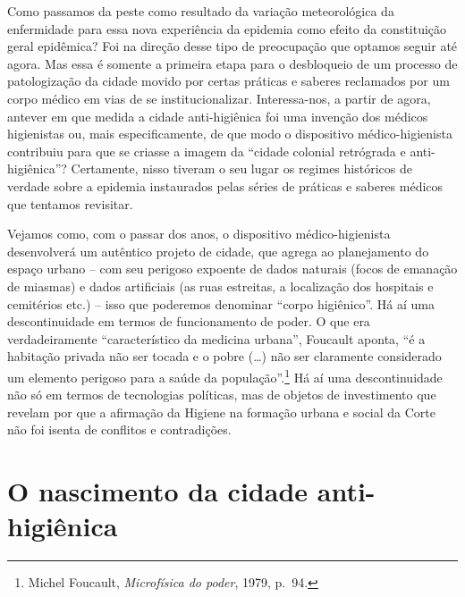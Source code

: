 Como passamos da peste como resultado da variação meteorológica da
enfermidade para essa nova experiência da epidemia como efeito da
constituição geral epidêmica? Foi na direção desse tipo de preocupação
que optamos seguir até agora. Mas essa é somente a primeira etapa para o
desbloqueio de um processo de patologização da cidade movido por certas
práticas e saberes reclamados por um corpo médico em vias de se
institucionalizar. Interessa-nos, a partir de agora, antever em que
medida a cidade anti-higiênica foi uma invenção dos médicos higienistas
ou, mais especificamente, de que modo o dispositivo médico-higienista
contribuiu para que se criasse a imagem da ``cidade colonial retrógrada
e anti-higiênica''? Certamente, nisso tiveram o seu lugar os regimes
históricos de verdade sobre a epidemia instaurados pelas séries de
práticas e saberes médicos que tentamos revisitar.

Vejamos como, com o passar dos anos, o dispositivo médico-higienista
desenvolverá um autêntico projeto de cidade, que agrega ao planejamento
do espaço urbano -- com seu perigoso expoente de dados naturais (focos
de emanação de miasmas) e dados artificiais (as ruas estreitas, a
localização dos hospitais e cemitérios etc.) -- isso que poderemos
denominar ``corpo higiênico''. Há aí uma descontinuidade em termos de
funcionamento de poder. O que era verdadeiramente ``característico da
medicina urbana'', Foucault aponta, ``é a habitação privada não ser
tocada e o pobre (\ldots{}) não ser claramente considerado um elemento
perigoso para a saúde da população''.\footnote{Michel Foucault,
  \emph{Microfísica do poder}, 1979, p.~94.} Há aí uma descontinuidade
não só em termos de tecnologias políticas, mas de objetos de
investimento que revelam por que a afirmação da Higiene na formação
urbana e social da Corte não foi isenta de conflitos e contradições.

\hypertarget{o-nascimento-da-cidade-anti-higiuxeanica}{%
\chapter{O nascimento da cidade
anti-higiênica}\label{o-nascimento-da-cidade-anti-higiuxeanica}}

